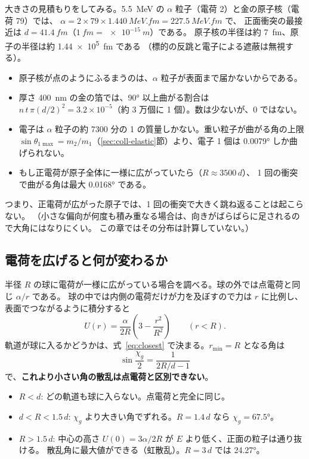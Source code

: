 大きさの見積もりをしてみる。\qty{5.5}{MeV} の $\alpha$ 粒子（電荷 2）と金の原子核（電荷 79）では、
$\alpha=2\times79\times\qty{1.440}{MeV.fm}=\qty{227.5}{MeV.fm}$ で、
正面衝突の最接近は $d=\qty{41.4}{fm}$（$\qty{1}{fm}=\qty{e-15}{m}$）である。
原子核の半径は約 \qty{7}{fm}、原子の半径は約 \qty{1.44e5}{fm} である
（標的の反跳と電子による遮蔽は無視する）。
\begin{itemize}
  \item 原子核が点のようにふるまうのは、$\alpha$ 粒子が表面まで届かないからである。
  \item 厚さ \qty{400}{nm} の金の箔では、\ang{90} 以上曲がる割合は
    $n\,t\,\pi(d/2)^2=3.2\times10^{-5}$（約 3 万個に 1 個）。数は少ないが、0 ではない。
  \item 電子は $\alpha$ 粒子の約 7300 分の 1 の質量しかない。重い粒子が曲がる角の上限
    $\sin\theta_{1\max}=m_2/m_1$（\ref{sec:coll-elastic}節）より、電子 1 個は \ang{0.0079} しか曲げられない。
  \item もし正電荷が原子全体に一様に広がっていたら（$R\approx3500\,d$）、
    1 回の衝突で曲がる角は最大 \ang{0.0168} である。
\end{itemize}
つまり、正電荷が広がった原子では、1 回の衝突で大きく跳ね返ることは起こらない。
（小さな偏向が何度も積み重なる場合は、向きがばらばらに足されるので大角にはなりにくい。
この章ではその分布は計算していない。）

\subsection*{電荷を広げると何が変わるか}

半径 $R$ の球に電荷が一様に広がっている場合を調べる。球の外では点電荷と同じ $\alpha/r$ である。
球の中では内側の電荷だけが力を及ぼすので力は $r$ に比例し、表面でつながるように積分すると
\begin{equation}
  U(r)=\frac{\alpha}{2R}\left(3-\frac{r^2}{R^2}\right)\qquad(r<R).
  \label{eq:uniform-ball}
\end{equation}
軌道が球に入るかどうかは、式~\eqref{eq:closest} で決まる。$r_{\min}=R$ となる角は
\begin{equation}
  \sin\frac{\chi_g}{2}=\frac{1}{2R/d-1}
  \label{eq:graze}
\end{equation}
で、\textbf{これより小さい角の散乱は点電荷と区別できない}。
\begin{itemize}
  \item $R<d$: どの軌道も球に入らない。点電荷と完全に同じ。
  \item $d<R<1.5\,d$: $\chi_g$ より大きい角でずれる。$R=1.4\,d$ なら $\chi_g=\ang{67.5}$。
  \item $R>1.5\,d$: 中心の高さ $U(0)=3\alpha/2R$ が $E$ より低く、正面の粒子は通り抜ける。
    散乱角に最大値ができる（虹散乱）。$R=3\,d$ では \ang{24.27}。
\end{itemize}


